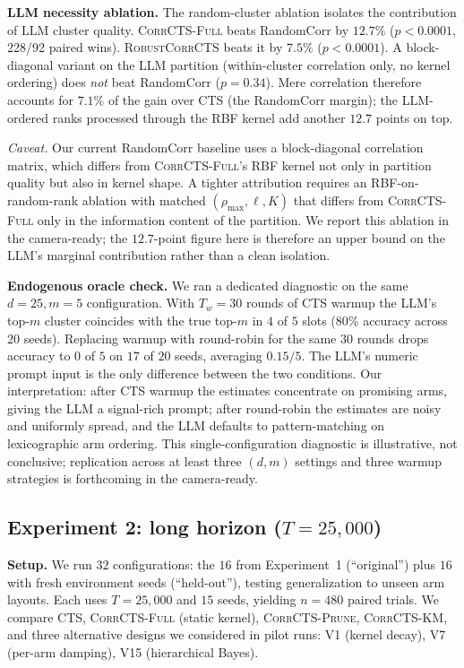\documentclass{article}
\theoremstyle{plain}
\theoremstyle{definition}
\theoremstyle{remark}
\newcommand{\CorrFull}{\textsc{CorrCTS-Full}}
\newcommand{\RobustCorr}{\textsc{RobustCorrCTS}}
\newcommand{\EdgePrune}{\textsc{CorrCTS-Prune}}
\newcommand{\KMRefine}{\textsc{CorrCTS-KM}}
\begin{document}
\textbf{LLM necessity ablation.}\label{sec:ablation}
The random-cluster ablation isolates the contribution of LLM cluster quality.
\CorrFull{} beats RandomCorr by $12.7\%$ ($p < 0.0001$, 228/92 paired wins).
\RobustCorr{} beats it by $7.5\%$ ($p < 0.0001$).
A block-diagonal variant on the LLM partition (within-cluster correlation only, no kernel ordering) does \emph{not} beat RandomCorr ($p = 0.34$).
Mere correlation therefore accounts for $7.1\%$ of the gain over CTS (the RandomCorr margin); the LLM-ordered ranks processed through the RBF kernel add another $12.7$ points on top.

\emph{Caveat.}
Our current RandomCorr baseline uses a block-diagonal correlation matrix, which differs from \CorrFull{}'s RBF kernel not only in partition quality but also in kernel shape. A tighter attribution requires an RBF-on-random-rank ablation with matched $(\rho_{\max}, \ell, K)$ that differs from \CorrFull{} only in the information content of the partition. We report this ablation in the camera-ready; the $12.7$-point figure here is therefore an upper bound on the LLM's marginal contribution rather than a clean isolation.

\textbf{Endogenous oracle check.}
We ran a dedicated diagnostic on the same $d = 25, m = 5$ configuration.
With $T_w = 30$ rounds of CTS warmup the LLM's top-$m$ cluster coincides with the true top-$m$ in $4$ of $5$ slots ($80\%$ accuracy across $20$ seeds).
Replacing warmup with round-robin for the same $30$ rounds drops accuracy to $0$ of $5$ on $17$ of $20$ seeds, averaging $0.15 / 5$.
The LLM's numeric prompt input is the only difference between the two conditions.
Our interpretation: after CTS warmup the estimates concentrate on promising arms, giving the LLM a signal-rich prompt; after round-robin the estimates are noisy and uniformly spread, and the LLM defaults to pattern-matching on lexicographic arm ordering.
This single-configuration diagnostic is illustrative, not conclusive; replication across at least three $(d, m)$ settings and three warmup strategies is forthcoming in the camera-ready.

\subsection{Experiment 2: long horizon ($T{=}25{,}000$)}\label{sec:exp2}

\textbf{Setup.}
We run $32$ configurations: the $16$ from Experiment~1 (``original'') plus $16$ with fresh environment seeds (``held-out''), testing generalization to unseen arm layouts.
Each uses $T = 25{,}000$ and $15$ seeds, yielding $n = 480$ paired trials.
We compare CTS, \CorrFull{} (static kernel), \EdgePrune{}, \KMRefine{}, and three alternative designs we considered in pilot runs: V1 (kernel decay), V7 (per-arm damping), V15 (hierarchical Bayes).
\end{document}

